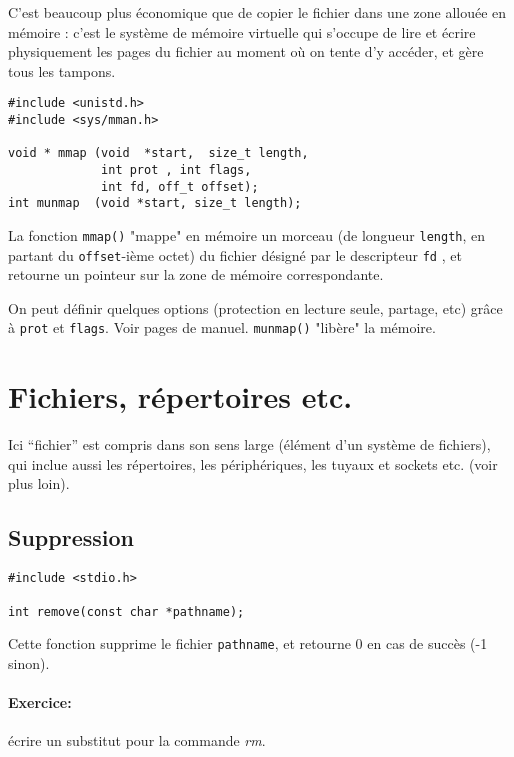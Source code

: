 C'est beaucoup plus économique que de copier le fichier dans
une zone allouée en mémoire : c'est le système
de mémoire virtuelle qui s'occupe de lire et écrire physiquement les
pages du fichier au moment où on tente d'y accéder, et gère tous les
tampons.


  

\extrait
\begin{lstlisting}
#include <unistd.h>
#include <sys/mman.h>

void * mmap (void  *start,  size_t length, 
             int prot , int flags, 
             int fd, off_t offset);
int munmap  (void *start, size_t length);
\end{lstlisting}


La fonction \texttt{mmap()} "mappe" en mémoire un morceau (de longueur
\texttt{length}, en partant du \texttt{offset}-ième octet) du
fichier désigné par le descripteur \texttt{fd} , et retourne
un pointeur sur la zone de mémoire correspondante.

On peut définir quelques options  (protection en lecture seule, 
partage, etc)
grâce à \texttt{prot} et \texttt{flags}. Voir pages de manuel.
\texttt{munmap()} "libère" la mémoire.



\source



\section{Fichiers, répertoires etc.}

Ici ``fichier'' est compris dans son sens large (élément d'un système
de fichiers), qui inclue aussi les répertoires, les périphériques, les
tuyaux et sockets etc. (voir plus loin).


\subsection{Suppression}

  
\extrait
\begin{lstlisting}
#include <stdio.h>

int remove(const char *pathname);
\end{lstlisting}


Cette fonction supprime le fichier \texttt{pathname}, et retourne 0 en
cas de succès (-1 sinon).

\paragraph*{Exercice: } écrire un substitut pour la commande \emph{rm}.

